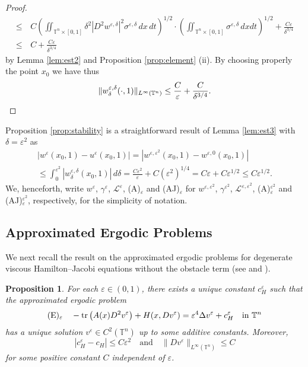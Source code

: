 \documentclass[12pt,reqno]{amsart}
\theoremstyle{plain}
\newtheorem{prop}[thm]{Proposition}
\theoremstyle{remark}
\numberwithin{equation}{section}
\begin{document}
\begin{proof}
\begin{align*}
\le&\, 
C\left(\iint_{{\mathbb{T}}^n\times[0,1]}{\delta}^2|D^2 w^{\varepsilon,{\delta}}|^2 \sigma^{\varepsilon, {\delta}}\, dx \, dt\right)^{1/2}\cdot\left( \iint_{{\mathbb{T}}^n \times [0,1]}{\sigma}^{{\varepsilon},{\delta}}\,dxdt\right)^{1/2}
+\frac{C{\varepsilon}}{{\delta}^{3/4}}\\
\le&\, C+\frac{C{\varepsilon}}{{\delta}^{3/4}}
\end{align*}
by Lemma \ref{lem:est2} and Proposition \ref{prop:element} (ii). 
By choosing properly the point $x_0$ we have thus
\[
\| w^{\varepsilon,{\delta}}_{\delta} (\cdot, 1) \|_{L^{\infty}({\mathbb{T}}^n)} 
\leq \frac{C}{\varepsilon}+\frac{C}{{\delta}^{3/4}}.
\qedhere\]
\end{proof}

Proposition \ref{prop:stability} is a straightforward result of Lemma 
\ref{lem:est3} with ${\delta}={\varepsilon}^2$ as
\begin{multline*}
|w^{\varepsilon}(x_0,1)-u^{\varepsilon}(x_0,1)|=|w^{{\varepsilon},{\varepsilon}^2}(x_0,1)-w^{{\varepsilon},0}(x_0,1)|\\
\leq \int_0^{{\varepsilon}^2}| w^{{\varepsilon},{\delta}}_{\delta}(x_0,1)|\,d{\delta}
=\frac{C {\varepsilon}^2}{\varepsilon}+C \left({\varepsilon}^2\right)^{1/4}=C{\varepsilon}+C{\varepsilon}^{1/2} \leq C{\varepsilon}^{1/2}.
\end{multline*} 
We, henceforth, write $w^{\varepsilon}$, ${\gamma}^{\varepsilon}$, ${\mathcal{L}}^{\varepsilon}$, (A)$_{\varepsilon}$ 
and (AJ)$_{\varepsilon}$ for $w^{{\varepsilon},{\varepsilon}^2}$, ${\gamma}^{{\varepsilon}^2}$, ${\mathcal{L}}^{{\varepsilon},{\varepsilon}^2}$, 
(A)$_{\varepsilon}^{{\varepsilon}^2}$ and (AJ)$_{\varepsilon}^{{\varepsilon}^2}$, respectively, 
for the simplicity of notation. 

\subsection{Approximated Ergodic Problems}
We next recall the result on the approximated ergodic problems
for degenerate viscous Hamilton--Jacobi equations without the obstacle term
(see \cite[Proposition 2.2]{CGMT} and \cite[Subsection 2.4]{CGMT}).
\begin{prop}\label{prop.AE}
For each ${\varepsilon} \in (0,1)$, there exists a unique constant $c_H^{\varepsilon}$ such that 
the approximated ergodic problem
$$
{\rm (E)_{\varepsilon}}\quad -{{\rm tr}\,}\big(A(x)D^2 v^{\varepsilon}\big)+H(x,Dv^{\varepsilon})={\varepsilon}^4{\Delta} v^{\varepsilon} + c_H^{\varepsilon} \quad \text{in}\ {\mathbb{T}}^n
$$
has a unique solution $v^{\varepsilon}\in C^2({\mathbb{T}}^n)$ up to some additive constants. Moreover,
$$
|c_H^{\varepsilon}-c_H|\le C{\varepsilon}^2 \quad \text{and} \quad \|Dv^{\varepsilon}\|_{L^\infty({\mathbb{T}}^n)} \leq C
$$
for some positive constant $C$ independent of ${\varepsilon}$.
\end{prop}
\end{document}
